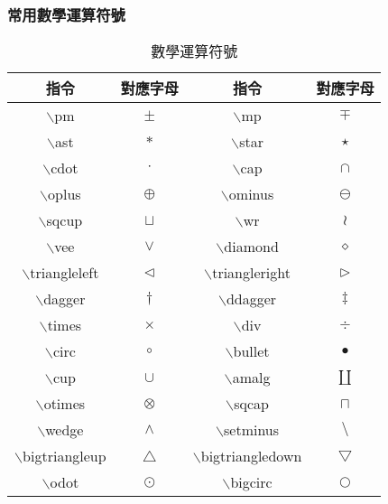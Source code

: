 \subsubsection{常用數學運算符號}
\begin{longtable}{c c c c}
    \caption{數學運算符號}\label{tb:sign} \\
     指令 & 對應字母 & 指令 & 對應字母 \\\hline 
     {\A $\backslash$pm} & $\pm$ & {\A $\backslash$mp} & $\mp$ \\
     {\A $\backslash$ast}  & $\ast$ & {\A $\backslash$star} & $\star$ \\
     {\A $\backslash$cdot} & $\cdot$ & {\A $\backslash$cap} & $\cap$ \\
     {\A $\backslash$oplus} & $\oplus$	& {\A $\backslash$ominus} & $\ominus$ \\
     {\A $\backslash$sqcup} & $\sqcup$ & {\A $\backslash$wr} & $\wr$ \\
     {\A $\backslash$vee} & $\vee$ & {\A $\backslash$diamond} & $\diamond$ \\
     {\A $\backslash$triangleleft} & $\triangleleft$ & {\A $\backslash$triangleright} & $\triangleright$ \\
     {\A $\backslash$dagger} &  $\dagger$ & {\A $\backslash$ddagger}  & $\ddagger$ \\
     {\A $\backslash$times} & $\times$ & {\A $\backslash$div}  & $\div$ \\
     {\A $\backslash$circ} & $\circ$ & {\A $\backslash$bullet} & $\bullet$ \\
     {\A $\backslash$cup} & $\cup$ & {\A $\backslash$amalg} & $\amalg$ \\
     {\A $\backslash$otimes} & $\otimes$ & {\A $\backslash$sqcap} & $\sqcap$ \\
     {\A $\backslash$wedge} & $\wedge$ & {\A $\backslash$setminus} & $\setminus$\\ 
     {\A $\backslash$bigtriangleup} & $\bigtriangleup$ & {\A $\backslash$bigtriangledown} & $\bigtriangledown$ \\
     {\A $\backslash$odot} & $\odot$ & {\A $\backslash$bigcirc} & $\bigcirc$ \\\hline
\end{longtable}

